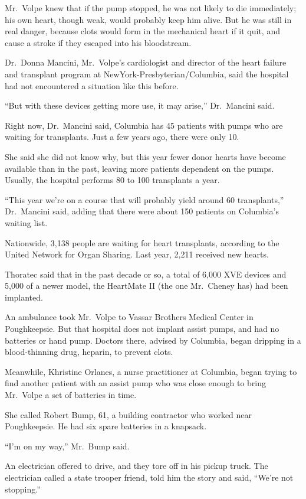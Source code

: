 ﻿\documentclass[12pt]{article}
\begin{document}
Mr.~Volpe knew that if the pump stopped, he was not likely to die immediately; his own heart, though
weak, would probably keep him alive. But he was still in real danger, because clots would form in
the mechanical heart if it quit, and cause a stroke if they escaped into his bloodstream.

Dr.~Donna Mancini, Mr.~Volpe's cardiologist and director of the heart failure and transplant program
at NewYork-Presbyterian/Columbia, said the hospital had not encountered a situation like this
before.

``But with these devices getting more use, it may arise,'' Dr.~Mancini said.

Right now, Dr.~Mancini said, Columbia has 45 patients with pumps who are waiting for transplants.
Just a few years ago, there were only 10.

She said she did not know why, but this year fewer donor hearts have become available than in the
past, leaving more patients dependent on the pumps. Usually, the hospital performs 80 to 100
transplants a year.

``This year we're on a course that will probably yield around 60 transplants,'' Dr.~Mancini said,
adding that there were about 150 patients on Columbia's waiting list.

Nationwide, 3,138 people are waiting for heart transplants, according to the United Network for
Organ Sharing. Last year, 2,211 received new hearts.

Thoratec said that in the past decade or so, a total of 6,000 XVE devices and 5,000 of a newer
model, the HeartMate II (the one Mr.~Cheney has) had been implanted.

An ambulance took Mr.~Volpe to Vassar Brothers Medical Center in Poughkeepsie. But that hospital
does not implant assist pumps, and had no batteries or hand pump. Doctors there, advised by
Columbia, began dripping in a blood-thinning drug, heparin, to prevent clots.

Meanwhile, Khristine Orlanes, a nurse practitioner at Columbia, began trying to find another patient
with an assist pump who was close enough to bring Mr.~Volpe a set of batteries in time.

She called Robert Bump, 61, a building contractor who worked near Poughkeepsie. He had six spare
batteries in a knapsack.

``I'm on my way,'' Mr.~Bump said.

An electrician offered to drive, and they tore off in his pickup truck. The electrician called a
state trooper friend, told him the story and said, ``We're not stopping.''
\end{document}
